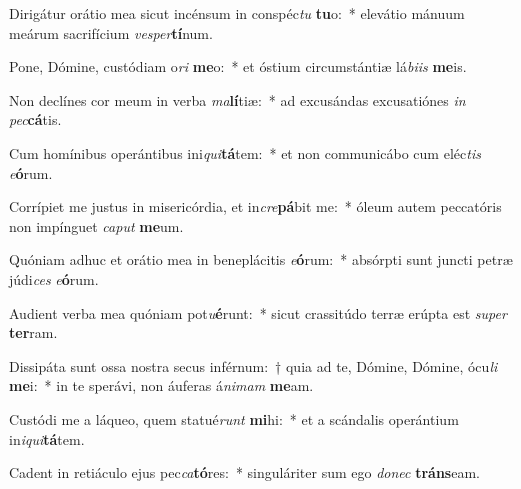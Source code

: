 \item Dirigátur orátio mea sicut incénsum in conspéc\textit{tu} \textbf{tu}o:~* elevátio mánuum meárum sacrifícium \textit{ves}\textit{per}\textbf{tí}num.
\item Pone, Dómine, custódiam o\textit{ri} \textbf{me}o:~* et óstium circumstántiæ lá\textit{bi}\textit{is} \textbf{me}is.
\item Non declínes cor meum in verba \textit{ma}\textbf{lí}tiæ:~* ad excusándas excusatiónes \textit{in} \textit{pec}\textbf{cá}tis.
\item Cum homínibus operántibus ini\textit{qui}\textbf{tá}tem:~* et non communicábo cum eléc\textit{tis} \textit{e}\textbf{ó}rum.
\item Corrípiet me justus in misericórdia, et in\textit{cre}\textbf{pá}bit me:~* óleum autem peccatóris non impínguet \textit{ca}\textit{put} \textbf{me}um.
\item Quóniam adhuc et orátio mea in beneplácitis \textit{e}\textbf{ó}rum:~* absórpti sunt juncti petræ júdi\textit{ces} \textit{e}\textbf{ó}rum.
\item Audient verba mea quóniam pot\textit{u}\textbf{é}runt:~* sicut crassitúdo terræ erúpta est \textit{su}\textit{per} \textbf{ter}ram.
\item Dissipáta sunt ossa nostra secus inférnum:~† quia ad te, Dómine, Dómine, ócu\textit{li} \textbf{me}i:~* in te sperávi, non áuferas á\textit{ni}\textit{mam} \textbf{me}am.
\item Custódi me a láqueo, quem statué\textit{runt} \textbf{mi}hi:~* et a scándalis operántium in\textit{i}\textit{qui}\textbf{tá}tem.
\item Cadent in retiáculo ejus pec\textit{ca}\textbf{tó}res:~* singuláriter sum ego \textit{do}\textit{nec} \textbf{tráns}eam.
